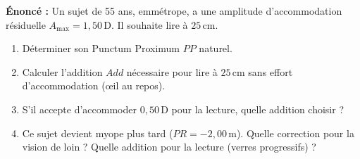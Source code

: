 \documentclass[11pt]{article}
\begin{document}
\begin{exoresolu}
\textbf{Énoncé :} Un sujet de 55 ans, emmétrope, a une amplitude d'accommodation résiduelle $A_{\text{max}} = 1,50\,\text{D}$. Il souhaite lire à $25\,\text{cm}$.
\begin{enumerate}
    \item Déterminer son Punctum Proximum $PP$ naturel.
    \item Calculer l'addition $Add$ nécessaire pour lire à $25\,\text{cm}$ sans effort d'accommodation (œil au repos).
    \item S'il accepte d'accommoder $0,50\,\text{D}$ pour la lecture, quelle addition choisir ?
    \item Ce sujet devient myope plus tard ($PR = -2,00\,\text{m}$). Quelle correction pour la vision de loin ? Quelle addition pour la lecture (verres progressifs) ?
\end{enumerate}


\end{exoresolu}
\end{document}
